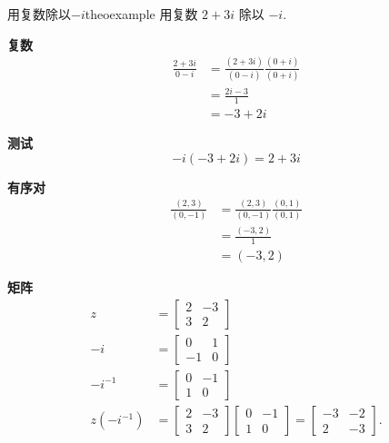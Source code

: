\begin{myexample}{用复数除以\boldmath$-i$}{theoexample}
用复数 $2+3 i$ 除以 $-i$.

\textbf{复数}
$$
  \begin{aligned}
    \frac{2+3 i}{0-i} & =\frac{(2+3 i)}{(0-i)} \frac{(0+i)}{(0+i)} \\
                      & =\frac{2 i-3}{1}                           \\
                      & =-3+2 i
  \end{aligned}
$$

\textbf{测试}
$$
  -i(-3+2 i)=2+3 i
$$

\textbf{有序对}
$$
  \begin{aligned}
    \frac{(2,3)}{(0,-1)} & =\frac{(2,3)}{(0,-1)} \frac{(0,1)}{(0,1)} \\
                         & =\frac{(-3,2)}{1}                         \\
                         & =(-3,2)
  \end{aligned}
$$

\textbf{矩阵}
$$
  \begin{aligned}
    z                     & =\left[\begin{array}{cc}
        2 & -3 \\
        3 & 2
      \end{array}\right]                                                                                    \\
    -i                    & =\left[\begin{array}{cc}
        0  & 1 \\
        -1 & 0
      \end{array}\right]                                                                                    \\
    -i^{-1}               & =\left[\begin{array}{cc}
        0 & -1 \\
        1 & 0
      \end{array}\right]                                                                                    \\
    z\left(-i^{-1}\right) & =\left[\begin{array}{cc}
        2 & -3 \\
        3 & 2
      \end{array}\right]\left[\begin{array}{cc}
        0 & -1 \\
        1 & 0
      \end{array}\right]=\left[\begin{array}{cc}
        -3 & -2 \\
        2  & -3
      \end{array}\right] .
  \end{aligned}
$$
\end{myexample}

